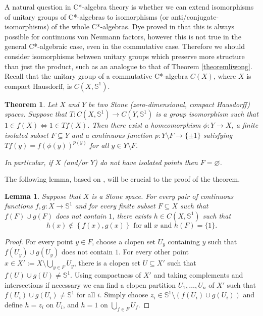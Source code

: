 \documentclass[letter,11pt]{amsart}
\theoremstyle{plain}		\newtheorem{theorem}[generalnumbering]{Theorem}
\theoremstyle{plain}		\newtheorem{corollary}[generalnumbering]{Corollary}
\theoremstyle{definition}		\newtheorem{definition}[generalnumbering]{Definition}
\theoremstyle{definition}		\newtheorem{example}[generalnumbering]{Example}
\theoremstyle{plain}		\newtheorem{proposition}[generalnumbering]{Proposition}
\theoremstyle{plain}		\newtheorem{lemma}[generalnumbering]{Lemma}
\theoremstyle{plain}    \newtheorem{plainstyle}[generalnumbering]{\namefordifferentenvironment}
\theoremstyle{plain}    \newtheorem*{plainstyle*}{\namefordifferentenvironment}
\theoremstyle{definition}    \newtheorem{definitionstyle}[generalnumbering]{\namefordifferentenvironment}
\theoremstyle{definition}    \newtheorem*{definitionstyle*}{\namefordifferentenvironment}
\begin{document}
A natural question in C*-algebra theory is whether we can extend isomorphisms of unitary groups of C*-algebras to isomorphisms (or anti/conjugate-isomorphisms) of the whole C*-algebras. Dye proved in \cite{MR0066568} that this is always possible for continuous von Neumann factors, however this is not true in the general C*-algebraic case, even in the commutative case. Therefore we should consider isomorphisms between unitary groups which preserve more structure than just the product, such as an analogue to that of Theorem \ref{theoremliwong}. Recall that the unitary group of a commutative C*-algebra $C(X)$, where $X$ is compact Hausdorff, is $C(X,\mathbb{S}^1)$.

\begin{theorem}\label{theoremisomorphismgroupifcirclevaluedfunctions}
	Let $X$ and $Y$ be two Stone (zero-dimensional, compact Hausdorff) spaces. Suppose that $T\colon C(X,\mathbb{S}^1)\to C(Y,\mathbb{S}^1)$ is a group isomorphism such that $1\in f(X)\iff 1\in Tf(X)$. Then there exist a homeomorphism $\phi\colon Y\to X$, a finite isolated subset $F\subseteq Y$ and a continuous function $p\colon Y\setminus F\to\{\pm 1\}$ satisfying $Tf(y)=f(\phi(y))^{p(y)}$ for all $y\in Y\setminus F$.
	
	In particular, if $X$ (and/or $Y$) do not have isolated points then $F=\varnothing$.
\end{theorem}

The following lemma, based on \cite{MR3162258}, will be crucial to the proof of the theorem.

\begin{lemma}\label{lemmatheoremisomorphismgroupifcirclevaluedfunctions}
	Suppose that $X$ is a Stone space. For every pair of continuous functions $f,g\colon X\to\mathbb{S}^1$ and for every finite subset $F\subseteq X$ such that $f(F)\cup g(F)$ does not contain $1$, there exists $h\in C(X,\mathbb{S}^1)$ such that
	\[h(x)\not\in\left\{f(x),g(x)\right\}\text{ for all }x\text{ and }h(F)=\{1\}.\]
\end{lemma}
\begin{proof}
	For every point $y\in F$, choose a clopen set $U_y$ containing $y$ such that $f(U_y)\cup g(U_y)$ does not contain $1$. For every other point $x\in X':=X\setminus\bigcup_{y\in F}U_y$, there is a clopen set $U\subseteq X'$ such that $f(U)\cup g(U)\neq\mathbb{S}^1$. Using compactness of $X'$ and taking complements and intersections if necessary we can find a clopen partition $U_1,\ldots,U_n$ of $X'$ such that $f(U_i)\cup g(U_i)\neq\mathbb{S}^1$ for all $i$. Simply choose $z_i\in \mathbb{S}^1\setminus(f(U_i)\cup g(U_i))$ and define $h=z_i$ on $U_i$, and $h=1$ on $\bigcup_{f\in F}U_f$.
\end{proof}
\end{document}
